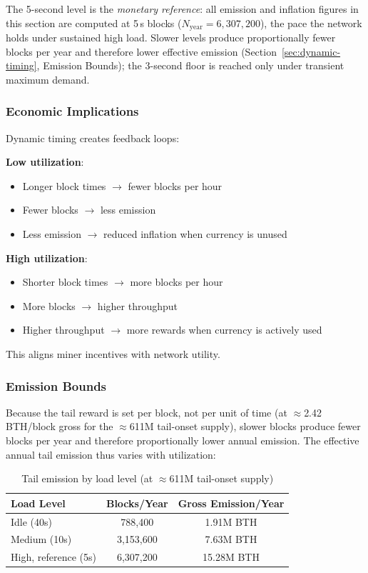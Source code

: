 The 5-second level is the \emph{monetary reference}: all emission and
inflation figures in this section are computed at 5\,s blocks
($N_{\text{year}} = 6{,}307{,}200$), the pace the network holds under
sustained high load. Slower levels produce proportionally fewer blocks per
year and therefore lower effective emission (Section~\ref{sec:dynamic-timing},
Emission Bounds); the 3-second floor is reached only under transient
maximum demand.



\subsubsection{Economic Implications}

Dynamic timing creates feedback loops:

\textbf{Low utilization}:
\begin{itemize}
  \item Longer block times $\rightarrow$ fewer blocks per hour
  \item Fewer blocks $\rightarrow$ less emission
  \item Less emission $\rightarrow$ reduced inflation when currency is
    unused
\end{itemize}

\textbf{High utilization}:
\begin{itemize}
  \item Shorter block times $\rightarrow$ more blocks per hour
  \item More blocks $\rightarrow$ higher throughput
  \item Higher throughput $\rightarrow$ more rewards when currency is
    actively used
\end{itemize}

This aligns miner incentives with network utility.

\subsubsection{Emission Bounds}

Because the tail reward is set per block, not per unit of time (at
$\approx$2.42 BTH/block gross for the $\approx$611M tail-onset supply), slower
blocks produce fewer blocks per year and therefore proportionally lower annual emission. The effective
annual tail emission thus varies with utilization:

\begin{table}[h]
\centering
\caption{Tail emission by load level (at $\approx$611M tail-onset supply)}
\label{tab:emission-util}
\begin{tabular}{@{}lcc@{}}
\toprule
\textbf{Load Level} & \textbf{Blocks/Year} & \textbf{Gross Emission/Year} \\
\midrule
Idle (40s)   & 788,400   & 1.91M BTH \\
Medium (10s) & 3,153,600 & 7.63M BTH \\
High, reference (5s) & 6,307,200 & 15.28M BTH \\
\bottomrule
\end{tabular}
\end{table}

